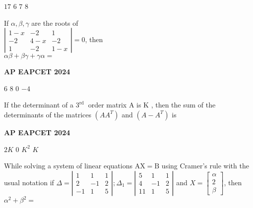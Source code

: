 \documentclass[11pt,paper=a4,answers]{exam}
\begin{document}
\begin{multicols}{2}
\begin{questions}
\begin{choices}
\choice  $\displaystyle 17$ 
\choice $\displaystyle 6$ 
\choice $\displaystyle 7$ 
\choice $\displaystyle 8$ 
\end{choices}



\question
If $\alpha, \beta, \gamma$ are the roots of \\  $\left|\begin{array}{ccc}1-x & -2 & 1 \\ -2 & 4-x & -2 \\ 1 & -2 & 1-x\end{array}\right|=0$, then \\ $\alpha \beta+\beta \gamma+\gamma \alpha=$


\begin{flushright}
\small\textbf{AP EAPCET 2024}
\end{flushright}


\begin{choices}
\choice  $\displaystyle 6$ 
\choice $\displaystyle 8$ 
\choice $\displaystyle 0$ 
\choice $\displaystyle - 4$ 
\end{choices}



\question
If the determinant of a $3^{\text {rd }}$ order matrix A is K , then the sum of the determinants of the matrices $\left(A A^T\right)$ and $\left(A-A^T\right)$ is


\begin{flushright}
\small\textbf{AP EAPCET 2024}
\end{flushright}


\begin{choices}
\choice  $\displaystyle 2K$ 
\choice $\displaystyle 0$ 
\choice $\displaystyle K^2$ 
\choice $\displaystyle K$ 
\end{choices}




\question
While solving a system of linear equations $\mathrm{AX}=\mathrm{B}$ using Cramer's rule with the usual notation if $\Delta=\left|\begin{array}{ccc}1 & 1 & 1 \\ 2 & -1 & 2 \\ -1 & 1 & 5\end{array}\right| ; \Delta_1=\left|\begin{array}{ccc}5 & 1 & 1 \\ 4 & -1 & 2 \\ 11 & 1 & 5\end{array}\right|$ and $X=\left[\begin{array}{l}\alpha \\ 2 \\ \beta\end{array}\right]$, then $\alpha^2+\beta^2=$


\end{questions}
\end{multicols}
\end{document}
